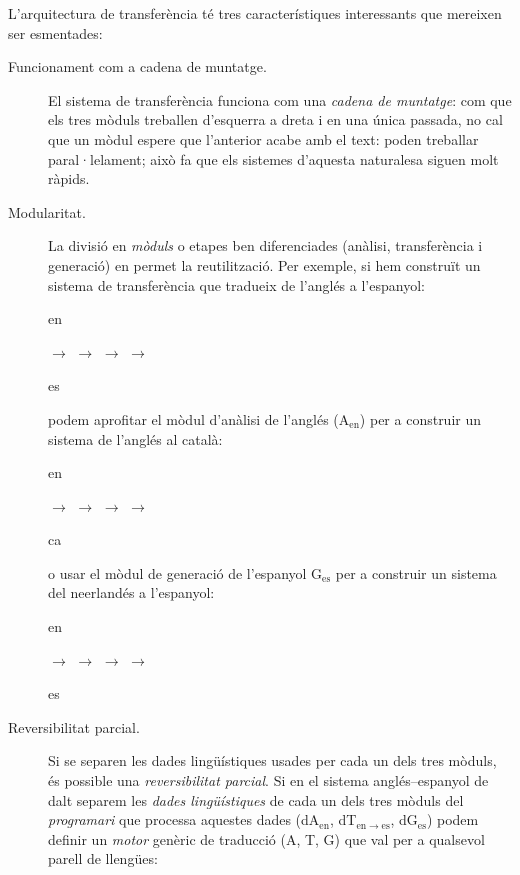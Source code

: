 L'arquitectura de transferència té tres característiques interessants
que mereixen ser esmentades:
\begin{description}
\item[Funcionament com a cadena de muntatge.] El sistema de
  transferència funciona com una \emph{cadena de muntatge}: com que
  els tres mòduls treballen d'esquerra a dreta i en una única passada,
  no cal que un mòdul espere que l'anterior acabe amb el text: poden
  treballar paral·lelament; això fa que els sistemes d'aquesta
  naturalesa siguen molt ràpids.
\item[Modularitat.] La divisió en \emph{mòduls} o etapes ben
  diferenciades (anàlisi, transferència i generació) en permet la
  reutilització. Per exemple, si hem construït un sistema de
  transferència que tradueix de l'anglés a l'espanyol:
  \begin{center}
 \parbox{0.5cm}{en} $\to$
  $\to$ 
  $\to$
  $\to$
 \parbox{0.5cm}{es} 
 \end{center}
 podem aprofitar el mòdul d'anàlisi de l'anglés (A\(_\mathrm{en}\))
 per a construir un sistema de l'anglés al català:
 \begin{center}
 \parbox{0.5cm}{en} $\to$
  $\to$ 
  $\to$
  $\to$
 \parbox{0.5cm}{ca} 
 \end{center}
 o usar el mòdul de generació de l'espanyol G\(_\mathrm{es}\) per a
 construir un sistema del neerlandés a l'espanyol:
 \begin{center}
 \parbox{0.5cm}{en} $\to$
  $\to$ 
  $\to$
  $\to$
 \parbox{0.5cm}{es} 
 \end{center}
\item[Reversibilitat parcial.]  Si se separen les dades lingüístiques
  usades per cada un dels tres mòduls,\label{pg:separacio} és possible una
  \emph{reversibilitat parcial}.  Si en el sistema anglés--espanyol de
  dalt separem les \emph{dades lingüístiques} de cada un dels tres
  mòduls del \emph{programari} que processa aquestes dades
  (dA\(_\mathrm{en}\), dT\(_\mathrm{en\to es}\), dG\(_\mathrm{es}\))
  podem definir un \emph{motor} genèric de traducció (A, T, G) que val
  per a qualsevol parell de llengües:

\end{description}
